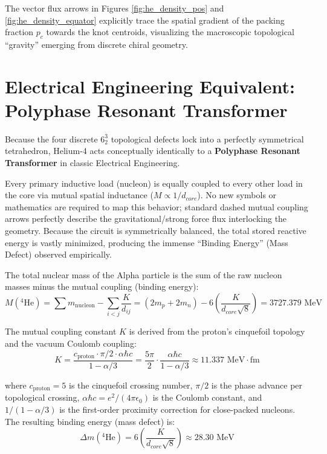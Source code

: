 The vector flux arrows in Figures \ref{fig:he_density_pos} and \ref{fig:he_density_equator} explicitly trace the spatial gradient of the packing fraction $p_c$ towards the knot centroids, visualizing the macroscopic topological ``gravity'' emerging from discrete chiral geometry.

\section{Electrical Engineering Equivalent: Polyphase Resonant Transformer}
Because the four discrete $6^3_2$ topological defects lock into a perfectly symmetrical tetrahedron, Helium-4 acts conceptually identically to a \textbf{Polyphase Resonant Transformer} in classic Electrical Engineering.

Every primary inductive load (nucleon) is equally coupled to every other load in the core via mutual spatial inductance ($M \propto 1/d_{core}$). No new symbols or mathematics are required to map this behavior; standard dashed mutual coupling arrows perfectly describe the gravitational/strong force flux interlocking the geometry. Because the circuit is symmetrically balanced, the total stored reactive energy is vastly minimized, producing the immense ``Binding Energy'' (Mass Defect) observed empirically.

The total nuclear mass of the Alpha particle is the sum of the raw nucleon masses minus the mutual coupling (binding energy):
\begin{equation}
    M(^{4}\text{He}) = \sum m_{\text{nucleon}} - \sum_{i<j} \frac{K}{d_{ij}} = (2m_p + 2m_n) - 6 \left( \frac{K}{d_{core}\sqrt{8}} \right) = 3727.379 \text{ MeV}
\end{equation}

The mutual coupling constant $K$ is derived from the proton's cinquefoil topology and the vacuum Coulomb coupling:
\begin{equation}
    K = \frac{c_{\text{proton}} \cdot \pi/2 \cdot \alpha \hbar c}{1 - \alpha/3} = \frac{5\pi}{2} \cdot \frac{\alpha \hbar c}{1 - \alpha/3} \approx 11.337 \text{ MeV}\cdot\text{fm}
\end{equation}

where $c_{\text{proton}} = 5$ is the cinquefoil crossing number, $\pi/2$ is the phase advance per topological crossing, $\alpha\hbar c = e^2/(4\pi\epsilon_0)$ is the Coulomb constant, and $1/(1-\alpha/3)$ is the first-order proximity correction for close-packed nucleons. The resulting binding energy (mass defect) is:
\begin{equation}
    \Delta m(^{4}\text{He}) = 6 \left( \frac{K}{d_{core}\sqrt{8}} \right) \approx 28.30 \text{ MeV}
\end{equation}

